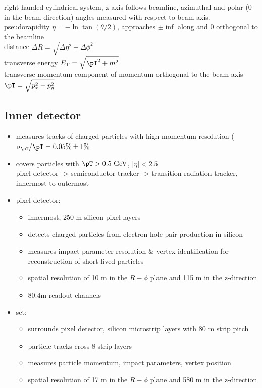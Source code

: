 \documentclass[../thesis.tex]{subfiles}
\begin{document}
right-handed cylindrical system, z-axis follows beamline, azimuthal and polar (0 in the beam direction) angles measured with respect to beam axis.\\
pseudorapidity $\eta = -\ln \tan (\theta/2)$, approaches $\pm\inf$ along and 0 orthogonal to the beamline\\
distance $\Delta R=\sqrt{\Delta \eta^2 + \Delta \phi^2}$\\
transverse energy $E_\text{T}=\sqrt{\pT ^2+m^2}$\\
transverse momentum \pT component of momentum orthogonal to the beam axis $\pT = \sqrt{p_x^2 + p_y^2}$

\subsection{Inner detector}
\begin{itemize}
\item measures tracks of charged particles with high momentum resolution ($\sigma_{\pT} / \pT = 0.05\% \pm 1\%$
\item covers particles with $\pT>0.5 \text{ GeV}$, $|\eta| < 2.5$\\
pixel detector -> semiconductor tracker -> transition radiation tracker, innermost to outermost
\item pixel detector:
\begin{itemize}
\item innermost, 250 \textmu m silicon pixel layers
\item detects charged particles from electron-hole pair production in silicon
\item measures impact parameter resolution \& vertex identification for reconstruction of short-lived particles
\item spatial resolution of 10 \textmu m in the $R-\phi$ plane and 115 \textmu m in the z-direction
\item 80.4m readout channels
\end{itemize} 
\item sct:
\begin{itemize}
\item surrounds pixel detector, silicon microstrip layers with 80 \textmu m strip pitch
\item particle tracks cross 8 strip layers
\item measures particle momentum, impact parameters, vertex position
\item spatial resolution of 17 \textmu m in the $R-\phi$ plane and 580 \textmu m in the z-direction

\end{itemize}
\end{itemize}
\end{document}
